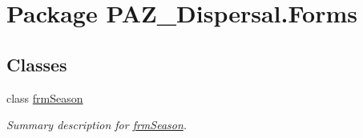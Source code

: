 \hypertarget{namespace_p_a_z___dispersal_1_1_forms}{\section{Package P\-A\-Z\-\_\-\-Dispersal.\-Forms}
\label{namespace_p_a_z___dispersal_1_1_forms}
}
\subsection*{Classes}
\begin{DoxyCompactItemize}
\item 
class \hyperlink{class_p_a_z___dispersal_1_1_forms_1_1frm_season}{frm\-Season}
\begin{DoxyCompactList}\small\item\em Summary description for \hyperlink{class_p_a_z___dispersal_1_1_forms_1_1frm_season}{frm\-Season}. \end{DoxyCompactList}\end{DoxyCompactItemize}
